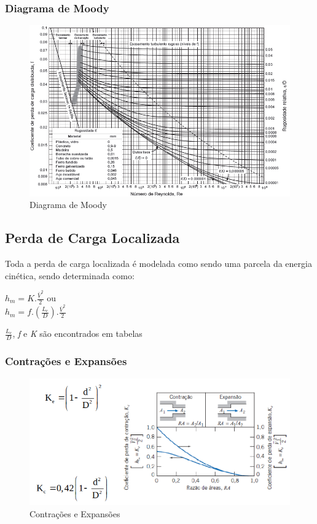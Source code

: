 \documentclass[a4paper, 12pt]{article}
\begin{document}
\subsubsection{Diagrama de Moody}
	\begin{figure}[h]
		\centering
		\includegraphics[width=0.9\linewidth]{imagens/moody}
		\caption{Diagrama de Moody}
		\label{fig:moody}
	\end{figure}

\newpage
\subsection{Perda de Carga Localizada}
	Toda a perda de carga localizada é modelada como sendo uma parcela da energia cinética, sendo determinada como:
	\begin{center}
		\Large
		$
		h_{m} = K.\frac{\bar{V}^2}{2}
		$ ou\\
		$
		h_{m} = f.(\frac{L_{e}}{D}).\frac{\bar{V}^2}{2}
		$
	\end{center}
	\textit{$\frac{L_{e}}{D}$}, \textit{f} e \textit{K} são encontrados em tabelas
	
\subsubsection{Contrações e Expansões}
	\begin{figure}[h]
		\centering
		\includegraphics[width=0.7\linewidth]{imagens/cargaloc}
		\caption{Contrações e Expansões}
		\label{fig:cargaloc}
	\end{figure}
\end{document}
